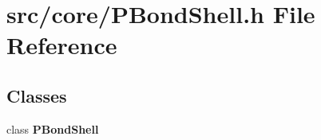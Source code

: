 \section{src/core/PBond\-Shell.h File Reference}
\label{PBondShell_8h}


\subsection*{Classes}
\begin{CompactItemize}
\item 
class {\bf PBond\-Shell}
\end{CompactItemize}
